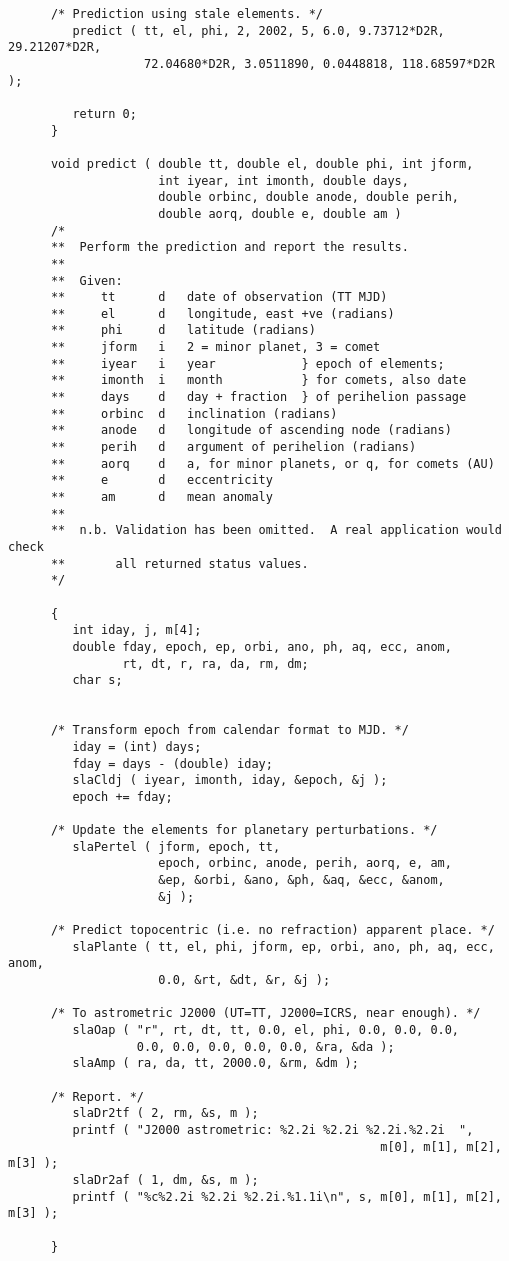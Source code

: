 \documentclass[11pt,fleqn,twoside]{article}
\renewcommand{\_}{{\tt\char'137}}     %
\begin{document}
\begin{verbatim}
      /* Prediction using stale elements. */
         predict ( tt, el, phi, 2, 2002, 5, 6.0, 9.73712*D2R, 29.21207*D2R,
                   72.04680*D2R, 3.0511890, 0.0448818, 118.68597*D2R );

         return 0;
      }

      void predict ( double tt, double el, double phi, int jform,
                     int iyear, int imonth, double days,
                     double orbinc, double anode, double perih,
                     double aorq, double e, double am )
      /*
      **  Perform the prediction and report the results.
      **
      **  Given:
      **     tt      d   date of observation (TT MJD)
      **     el      d   longitude, east +ve (radians)
      **     phi     d   latitude (radians)
      **     jform   i   2 = minor planet, 3 = comet
      **     iyear   i   year            } epoch of elements;
      **     imonth  i   month           } for comets, also date
      **     days    d   day + fraction  } of perihelion passage
      **     orbinc  d   inclination (radians)
      **     anode   d   longitude of ascending node (radians)
      **     perih   d   argument of perihelion (radians)
      **     aorq    d   a, for minor planets, or q, for comets (AU)
      **     e       d   eccentricity
      **     am      d   mean anomaly
      **
      **  n.b. Validation has been omitted.  A real application would check
      **       all returned status values.
      */

      {
         int iday, j, m[4];
         double fday, epoch, ep, orbi, ano, ph, aq, ecc, anom,
                rt, dt, r, ra, da, rm, dm;
         char s;


      /* Transform epoch from calendar format to MJD. */
         iday = (int) days;
         fday = days - (double) iday;
         slaCldj ( iyear, imonth, iday, &epoch, &j );
         epoch += fday;

      /* Update the elements for planetary perturbations. */
         slaPertel ( jform, epoch, tt,
                     epoch, orbinc, anode, perih, aorq, e, am,
                     &ep, &orbi, &ano, &ph, &aq, &ecc, &anom,
                     &j );

      /* Predict topocentric (i.e. no refraction) apparent place. */
         slaPlante ( tt, el, phi, jform, ep, orbi, ano, ph, aq, ecc, anom,
                     0.0, &rt, &dt, &r, &j );

      /* To astrometric J2000 (UT=TT, J2000=ICRS, near enough). */
         slaOap ( "r", rt, dt, tt, 0.0, el, phi, 0.0, 0.0, 0.0,
                  0.0, 0.0, 0.0, 0.0, 0.0, &ra, &da );
         slaAmp ( ra, da, tt, 2000.0, &rm, &dm );

      /* Report. */
         slaDr2tf ( 2, rm, &s, m );
         printf ( "J2000 astrometric: %2.2i %2.2i %2.2i.%2.2i  ",
                                                    m[0], m[1], m[2], m[3] );
         slaDr2af ( 1, dm, &s, m );
         printf ( "%c%2.2i %2.2i %2.2i.%1.1i\n", s, m[0], m[1], m[2], m[3] );

      }
\end{verbatim}
\end{document}
